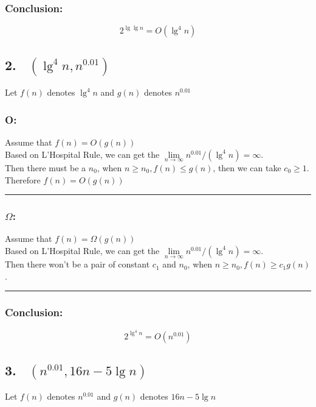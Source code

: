 \documentclass[oneside]{homework} %
\begin{document}
\subsubsection* {Conclusion:}
$$2^{\lg \lg n}= O(\lg ^4 n)$$

\subsection*{2. ~$(\lg ^4 n,n^{0.01})$}
Let $f(n)$ denotes $\lg ^4 n$ and $g(n)$ denotes $ n^{0.01} $
\subsubsection* {O:}
Assume that $f(n) = O(g(n))$\\
Based on L'Hospital Rule, we can get the $\lim\limits_{n\to\infty}{n^{0.01} / (\lg ^4 n)}  = \infty$.
\\Then there must be a $n_{0}$, when $n \geq n_{0} , f(n) \leq g(n) $, then we can take $c_{0} \geq 1$.
\\ Therefore $f(n) = O(g(n))$ 
\\ \rule{3mm}{3mm}

\subsubsection* {$\Omega$:}
Assume that $f(n) = \Omega (g(n))$\\
Based on L'Hospital Rule, we can get the $\lim\limits_{n\to\infty}{n^{0.01} / (\lg ^4 n)}  = \infty$.
\\Then there won't be a pair of constant $c_{1}$ and $n_{0}$, when $n \geq n_{0} , f(n) \geq c_{1}g(n) $.
\\ \rule{3mm}{3mm}

\subsubsection* {Conclusion:}
$$2^{\lg ^4 n}= O(n^{0.01})$$


\subsection*{3. ~$(n^{0.01},16n-5 \lg n)$}
Let $f(n)$ denotes $n^{0.01}$ and $g(n)$ denotes $16n-5 \lg n$
\end{document}
